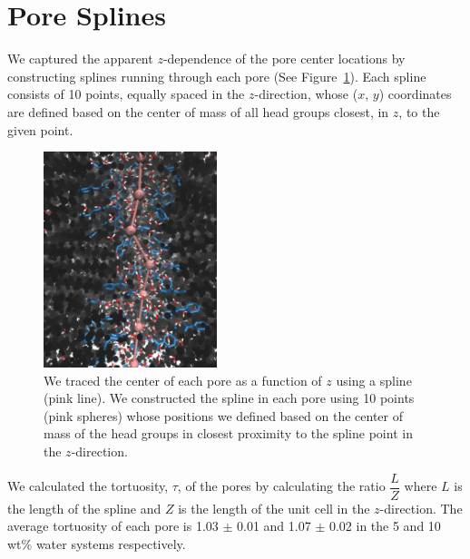 \documentclass{article}
\begin{document}
  \clearpage
  \section{Pore Splines}\label{section:splines}
  
  We captured the apparent $z$-dependence of the pore center locations by
  constructing splines running through each pore (See Figure~\ref{fig:spline}).
  Each spline consists of 10 points, equally spaced in the $z$-direction, whose
  ($x$, $y$) coordinates are defined based on the center of mass of all head
  groups closest, in $z$, to the given point.
  
  \begin{figure}[!htb]
  \centering
  \includegraphics[width=0.45\textwidth]{spline.pdf}
  \caption{We traced the center of each pore as a function of $z$ using a spline (pink
  line). We constructed the spline in each pore using 10 points (pink spheres) whose
  positions we defined based on the center of mass of the head groups in closest proximity
  to the spline point in the $z$-direction.}\label{fig:spline}
  \end{figure}
  
  We calculated the tortuosity, $\tau$, of the pores by calculating the 
  ratio $\dfrac{L}{Z}$ where $L$ is the length of the spline and $Z$ is 
  the length of the unit cell in the $z$-direction. The average tortuosity
  of each pore is 1.03 $\pm$ 0.01 and 1.07 $\pm$ 0.02 in the 5 and 10 wt\%
  water systems respectively.
  
\end{document}
